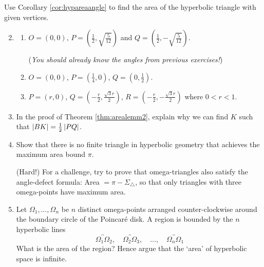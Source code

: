 \begin{exercises}
\exstart Use Corollary \ref{cor:hypareaangle} to find the area of the hyperbolic triangle with given vertices.
\begin{enumerate}\setcounter{enumi}{1}
  \item[]\begin{enumerate}
    \item $O=(0,0)$, $P=(\frac 12,\sqrt{\frac 5{12}})$ and $Q=(\frac 12,-\sqrt{\frac 5{12}})$.\par
		(\emph{You should already know the angles from previous exercises!})
    \item $O=(0,0)$, $P=(\frac 14,0)$, $Q=(0,\frac 12)$.
    \item $P=(r,0)$, $Q=\left(-\frac r2,\frac{\sqrt{3}r}2\right)$, $R=\left(-\frac r2,-\frac{\sqrt{3}r}2\right)$ where $0<r<1$.
	\end{enumerate}
	
	\item In the proof of Theorem \ref{thm:arealemm2}, explain why we can find $K$ such that $\left| BK\right|=\frac 12\left| PQ\right|$. 
	
	
% 
%   
%   
%     
   \item Show that there is no finite triangle in hyperbolic geometry that achieves the maximum area bound $\pi$.\par
  (Hard!) For a challenge, try to prove that omega-triangles also satisfy the angle-defect formula: Area $=\pi-\Sigma_\triangle$, so that only triangles with three omega-points have maximum area.

	\item Let $\Omega_1,\ldots,\Omega_n$ be $n$ distinct omega-points arranged counter-clockwise around the boundary circle of the Poincaré disk. A region is bounded by the $n$ hyperbolic lines
	\[\overleftrightarrow{\Omega_1\Omega_2},\quad \overleftrightarrow{\Omega_2\Omega_3},\quad\ldots,\quad\overleftrightarrow{\Omega_n\Omega_1}\]
	What is the area of the region? Hence argue that the `area' of hyperbolic space is infinite.
  

\end{enumerate}
\end{exercises}
